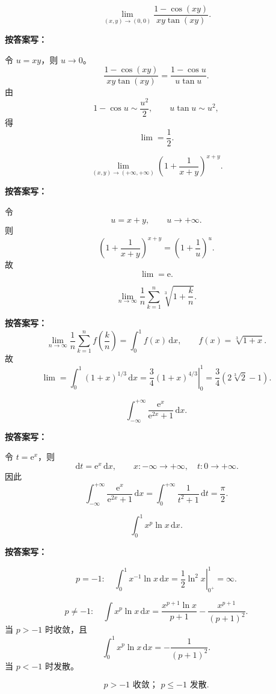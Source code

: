 \documentclass[11pt,a4paper,UTF8]{ctexart}
\newcommand{\dd}{\,\mathrm d}
\newcommand{\ee}{\mathrm e}
\begin{document}
\begin{answerbox}[例 1：二元极限，2024--2025]
\[
\lim_{(x,y)\to(0,0)}\frac{1-\cos(xy)}{xy\tan(xy)}.
\]

\textbf{按答案写：}

令 \(u=xy\)，则 \(u\to0\)。
\[
\frac{1-\cos(xy)}{xy\tan(xy)}
=\frac{1-\cos u}{u\tan u}.
\]
由
\[
1-\cos u\sim \frac{u^2}{2},\qquad u\tan u\sim u^2,
\]
得
\[
\boxed{\lim=\frac12.}
\]
\end{answerbox}

\begin{answerbox}[例 2：指数型极限，2020--2021]
\[
\lim_{(x,y)\to(+\infty,+\infty)}
\left(1+\frac1{x+y}\right)^{x+y}.
\]

\textbf{按答案写：}

令
\[
u=x+y,\qquad u\to+\infty.
\]
则
\[
\left(1+\frac1{x+y}\right)^{x+y}
=\left(1+\frac1u\right)^u.
\]
故
\[
\boxed{\lim=\ee.}
\]
\end{answerbox}

\begin{answerbox}[例 3：Riemann 和，2024--2025]
\[
\lim_{n\to\infty}\frac1n\sum_{k=1}^n\sqrt[3]{1+\frac kn}.
\]

\textbf{按答案写：}
\[
\lim_{n\to\infty}\frac1n\sum_{k=1}^n f\left(\frac kn\right)
=\int_0^1 f(x)\dd x,\qquad f(x)=\sqrt[3]{1+x}.
\]
故
\[
\lim=\int_0^1(1+x)^{1/3}\dd x
=\left.\frac34(1+x)^{4/3}\right|_0^1
=\boxed{\frac34(2\sqrt[3]{2}-1)}.
\]
\end{answerbox}

\begin{answerbox}[例 4：广义积分换元，2021--2022]
\[
\int_{-\infty}^{+\infty}\frac{\ee^x}{\ee^{2x}+1}\dd x.
\]

\textbf{按答案写：}

令 \(t=\ee^x\)，则
\[
\dd t=\ee^x\dd x,\qquad x:-\infty\to+\infty,\quad t:0\to+\infty.
\]
因此
\[
\int_{-\infty}^{+\infty}\frac{\ee^x}{\ee^{2x}+1}\dd x
=\int_0^{+\infty}\frac1{t^2+1}\dd t
=\boxed{\frac\pi2.}
\]
\end{answerbox}

\begin{answerbox}[例 5：反常积分，2024--2025]
\[
\int_0^1x^p\ln x\dd x.
\]

\textbf{按答案写：}

\[
p=-1:\quad \int_0^1x^{-1}\ln x\dd x
=\left.\frac12\ln^2x\right|_{0^+}^1=\infty.
\]

\[
p\ne-1:\quad
\int x^p\ln x\dd x
=\frac{x^{p+1}\ln x}{p+1}-\frac{x^{p+1}}{(p+1)^2}.
\]
当 \(p>-1\) 时收敛，且
\[
\boxed{\int_0^1x^p\ln x\dd x=-\frac1{(p+1)^2}}.
\]
当 \(p<-1\) 时发散。

\[
\boxed{p>-1\text{ 收敛； }p\le -1\text{ 发散}.}
\]
\end{answerbox}
\end{document}
